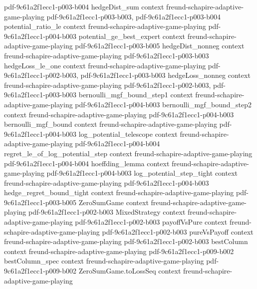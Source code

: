 \begin{lemma}
  {pdf-9c61a2f1ecc1-p003-b004}
\proofstep
  {hedgeDist_sum}
  {context}
  {freund-schapire-adaptive-game-playing}
  {pdf-9c61a2f1ecc1-p003-b003,
    pdf-9c61a2f1ecc1-p003-b004}
\proofstep
  {potential_ratio_le}
  {context}
  {freund-schapire-adaptive-game-playing}
  {pdf-9c61a2f1ecc1-p004-b003}
\proofstep
  {potential_ge_best_expert}
  {context}
  {freund-schapire-adaptive-game-playing}
  {pdf-9c61a2f1ecc1-p003-b005}
\proofstep
  {hedgeDist_nonneg}
  {context}
  {freund-schapire-adaptive-game-playing}
  {pdf-9c61a2f1ecc1-p003-b003}
\proofstep
  {hedgeLoss_le_one}
  {context}
  {freund-schapire-adaptive-game-playing}
  {pdf-9c61a2f1ecc1-p002-b003,
    pdf-9c61a2f1ecc1-p003-b003}
\proofstep
  {hedgeLoss_nonneg}
  {context}
  {freund-schapire-adaptive-game-playing}
  {pdf-9c61a2f1ecc1-p002-b003,
    pdf-9c61a2f1ecc1-p003-b003}
\proofstep
  {bernoulli_mgf_bound_step1}
  {context}
  {freund-schapire-adaptive-game-playing}
  {pdf-9c61a2f1ecc1-p004-b003}
\proofstep
  {bernoulli_mgf_bound_step2}
  {context}
  {freund-schapire-adaptive-game-playing}
  {pdf-9c61a2f1ecc1-p004-b003}
\proofstep
  {bernoulli_mgf_bound}
  {context}
  {freund-schapire-adaptive-game-playing}
  {pdf-9c61a2f1ecc1-p004-b003}
\proofstep
  {log_potential_telescope}
  {context}
  {freund-schapire-adaptive-game-playing}
  {pdf-9c61a2f1ecc1-p004-b004}
\proofstep
  {regret_le_of_log_potential_step}
  {context}
  {freund-schapire-adaptive-game-playing}
  {pdf-9c61a2f1ecc1-p004-b004}
\proofstep
  {hoeffding_lemma}
  {context}
  {freund-schapire-adaptive-game-playing}
  {pdf-9c61a2f1ecc1-p004-b003}
\proofstep
  {log_potential_step_tight}
  {context}
  {freund-schapire-adaptive-game-playing}
  {pdf-9c61a2f1ecc1-p004-b003}
\proofstep
  {hedge_regret_bound_tight}
  {context}
  {freund-schapire-adaptive-game-playing}
  {pdf-9c61a2f1ecc1-p003-b005}
\proofstep
  {ZeroSumGame}
  {context}
  {freund-schapire-adaptive-game-playing}
  {pdf-9c61a2f1ecc1-p002-b003}
\proofstep
  {MixedStrategy}
  {context}
  {freund-schapire-adaptive-game-playing}
  {pdf-9c61a2f1ecc1-p002-b003}
\proofstep
  {payoffVsPure}
  {context}
  {freund-schapire-adaptive-game-playing}
  {pdf-9c61a2f1ecc1-p002-b003}
\proofstep
  {pureVsPayoff}
  {context}
  {freund-schapire-adaptive-game-playing}
  {pdf-9c61a2f1ecc1-p002-b003}
\proofstep
  {bestColumn}
  {context}
  {freund-schapire-adaptive-game-playing}
  {pdf-9c61a2f1ecc1-p009-b002}
\proofstep
  {bestColumn_spec}
  {context}
  {freund-schapire-adaptive-game-playing}
  {pdf-9c61a2f1ecc1-p009-b002}
\proofstep
  {ZeroSumGame.toLossSeq}
  {context}
  {freund-schapire-adaptive-game-playing}

\end{lemma}
